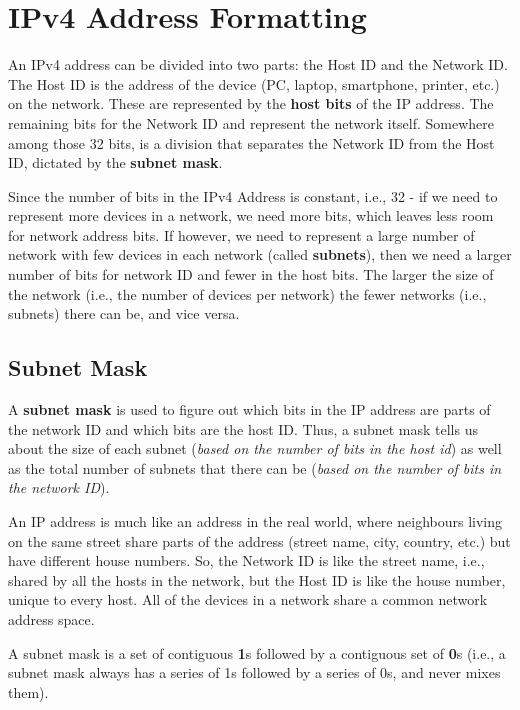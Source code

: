 \section{IPv4 Address Formatting}
An IPv4 address can be divided into two parts: the Host ID and the Network ID. The Host ID is the address of the device (PC, laptop, smartphone, printer, etc.) on the network. These are represented by the \textbf{host bits} of the IP address. The remaining bits for the Network ID and represent the network itself. Somewhere among those 32 bits, is a division that separates the Network ID from the Host ID, dictated by the \textbf{subnet mask}. 

Since the number of bits in the IPv4 Address is constant, i.e., 32 - if we need to represent more devices in a network, we need more bits, which leaves less room for network address bits. If however, we need to represent a large number of network with few devices in each network (called \textbf{subnets}), then we need a larger number of bits for network ID and fewer in the host bits. The larger the size of the network (i.e., the number of devices per network) the fewer networks (i.e., subnets) there can be, and vice versa. 

\subsection{Subnet Mask}
A \textbf{subnet mask} is used to figure out which bits in the IP address are parts of the network ID and which bits are the host ID. Thus, a subnet mask tells us about the size of each subnet (\textit{based on the number of bits in the host id}) as well as the total number of subnets that there can be (\textit{based on the number of bits in the network ID}). 

An IP address is much like an address in the real world, where neighbours living on the same street share parts of the address (street name, city, country, etc.) but have different house numbers. So, the Network ID is like the street name, i.e., shared by all the hosts in the network, but the Host ID is like the house number, unique to every host. All of the devices in a network share a common network address space.

A subnet mask is a set of contiguous \textbf{1}s followed by a contiguous set of \textbf{0}s (i.e., a subnet mask always has a series of 1s followed by a series of 0s, and never mixes them).

